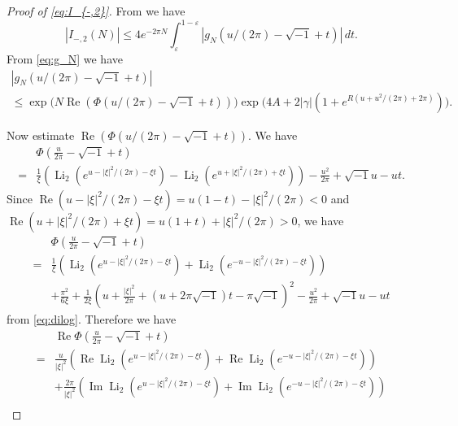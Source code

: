\documentclass[a4paper]{amsart}
\theoremstyle{plain}
\theoremstyle{definition}
\theoremstyle{remark}
\newcommand{\Li}{\operatorname{Li}}
\renewcommand{\Re}{\operatorname{Re}}
\renewcommand{\Im}{\operatorname{Im}}
\numberwithin{equation}{section}
\begin{document}
\begin{proof}[Proof of \eqref{eq:I_{-,2}}]
From \cite[Equation~(4.6)]{Andersen/Hansen:JKNOT2006} we have
\begin{equation*}
  |I_{-,2}(N)|
  \le
  4e^{-2\pi N}
  \int_{\varepsilon}^{1-\varepsilon}|g_N(u/(2\pi)-\sqrt{-1}+t)|\,dt.
\end{equation*}
From \eqref{eq:g_N} we have
\begin{multline*}
  |g_N(u/(2\pi)-\sqrt{-1}+t)|
  \\
  \le
  \exp\bigl(N\Re(\Phi(u/(2\pi)-\sqrt{-1}+t))\bigr)
  \exp\bigl(4A+2|\gamma|(1+e^{R(u+u^2/(2\pi)+2\pi)})\bigr).
\end{multline*}
\par
Now estimate $\Re(\Phi(u/(2\pi)-\sqrt{-1}+t))$.
We have
\begin{equation*}
\begin{split}
  &\Phi\left(\frac{u}{2\pi}-\sqrt{-1}+t\right)
  \\
  =&
  \frac{1}{\xi}
  \left(
    \Li_2(e^{u-|\xi|^2/(2\pi)-\xi t})
    -
    \Li_2(e^{u+|\xi|^2/(2\pi)+\xi t})
  \right)
  -\frac{u^2}{2\pi}+\sqrt{-1}u-ut.
\end{split}
\end{equation*}
Since $\Re(u-|\xi|^2/(2\pi)-\xi t)=u(1-t)-|\xi|^2/(2\pi)<0$ and $\Re(u+|\xi|^2/(2\pi)+\xi t)=u(1+t)+|\xi|^2/(2\pi)>0$, we have
\begin{equation*}
\begin{split}
  &\Phi\left(\frac{u}{2\pi}-\sqrt{-1}+t\right)
  \\
  =&
  \frac{1}{\xi}
  \left(
    \Li_2(e^{u-|\xi|^2/(2\pi)-\xi t})
    +
    \Li_2(e^{-u-|\xi|^2/(2\pi)-\xi t})
  \right)
  \\
  &
  +\frac{\pi^2}{6\xi}
  +\frac{1}{2\xi}
  \left(
    u+\frac{|\xi|^2}{2\pi}+(u+2\pi\sqrt{-1})t-\pi\sqrt{-1}
  \right)^2
  -\frac{u^2}{2\pi}+\sqrt{-1}u-ut
\end{split}
\end{equation*}
from \eqref{eq:dilog}.
Therefore we have
\begin{equation*}
\begin{split}
  &\Re\Phi\left(\frac{u}{2\pi}-\sqrt{-1}+t\right)
  \\
  =&
  \frac{u}{|\xi|^2}
  \left(
    \Re\Li_2(e^{u-|\xi|^2/(2\pi)-\xi t})
    +
    \Re\Li_2(e^{-u-|\xi|^2/(2\pi)-\xi t})
  \right)
  \\
  &
  +
  \frac{2\pi}{|\xi|^2}
  \left(
    \Im\Li_2(e^{u-|\xi|^2/(2\pi)-\xi t})
    +
    \Im\Li_2(e^{-u-|\xi|^2/(2\pi)-\xi t})
  \right)
  \\

\end{split}
\end{equation*}
\end{proof}
\end{document}
